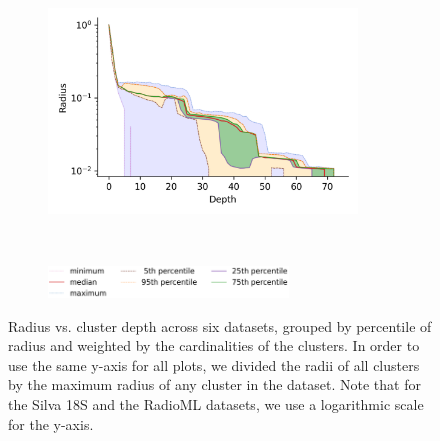 \documentclass{article}
\begin{document}
\begin{figure}
\begin{subfigure}[b]{0.47\textwidth}
        \includegraphics[width=0.9\textwidth]{images/radius/radio-ml.png}\\
        \label{fig:supplement:radioml-radius}
    \end{subfigure}%
    \\
    \vskip 0.005in
    \begin{subfigure}[b]{0.94\textwidth}
        \centering
        \includegraphics[width=0.7\textwidth]{images/radius/legend.png}
        \label{fig:supplement:radius-legend}
    \end{subfigure}%
    \caption{Radius vs. cluster depth across six datasets, grouped by percentile of radius and weighted by the cardinalities of the clusters.
    In order to use the same y-axis for all plots, we divided the radii of all clusters by the maximum radius of any cluster in the dataset.
    Note that for the Silva 18S and the RadioML datasets, we use a logarithmic scale for the y-axis.}
    \label{fig:supplement:radius-plots}
\end{figure}
\end{document}

